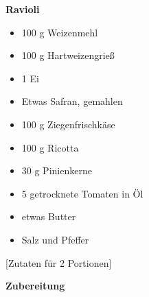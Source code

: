 

\parindent0pt	

\pagestyle{empty}


\textbf{{\LARGE Ravioli}}%

\hrulefill
\vspace*{\fill}
\begin{multicols}{2}	


\begin{itemize}
\item 100 g Weizenmehl
\item 100 g Hartweizengrieß
\item 1 Ei
\item Etwas Safran, gemahlen
\item 100 g Ziegenfrischkäse
\item 100 g Ricotta
\item 30 g Pinienkerne
\item 5 getrocknete Tomaten in Öl
\item etwas Butter
\item Salz und Pfeffer
\end{itemize}
\end{multicols}
\vfill									%

\vspace{0.5cm}
%
\begin{center}
%
[Zutaten für 2 Portionen]%
\end{center}


\vfill
\newpage
\textbf{{\LARGE Zubereitung}}%

\hrulefill

